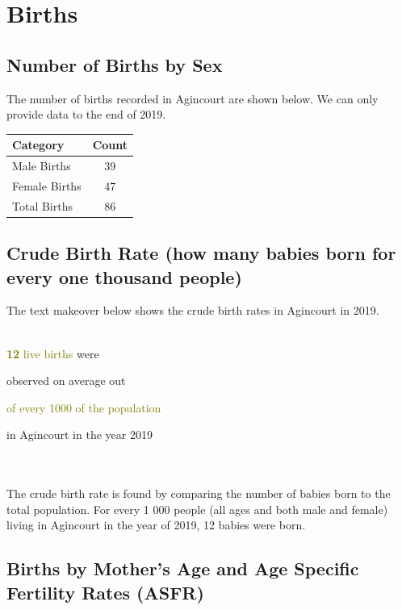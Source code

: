 \documentclass[15,a4paperpaper,]{article}
\begin{document}
\pagebreak
\section{Births}

\subsection{Number of Births by Sex}

The number of births recorded in Agincourt are shown below. We can only
provide data to the end of 2019.

\begin{table}[ht]
\centering
\begin{tabularx}{\textwidth}{|l|C|}
   \hline
Category & Count \\ 
  \hline
Male Births &  39 \\ 
  Female Births &  47 \\ 
  Total Births &  86 \\ 
   \hline
\end{tabularx}
\end{table}

\subsection{Crude Birth Rate (how many babies born for every one thousand people)}

The text makeover below shows the crude birth rates in Agincourt in
2019.

~\\
\begingroup {}\fontsize{70}{70}\selectfont
\textbf{\textcolor{olive}{12}} \endgroup \begingroup
\fontsize{30}{30}\selectfont \textcolor{olive}{live births} were

observed on average out

\textcolor{olive}{of every 1000 of the population}

in Agincourt in the year 2019 \endgroup

~\\
\hspace*{0.333em}\\
The crude birth rate is found by comparing the number of babies born to
the total population. For every 1 000 people (all ages and both male and
female) living in Agincourt in the year of 2019, 12 babies were born.

\subsection{Births by Mother's Age and Age Specific Fertility Rates (ASFR)}
\end{document}

